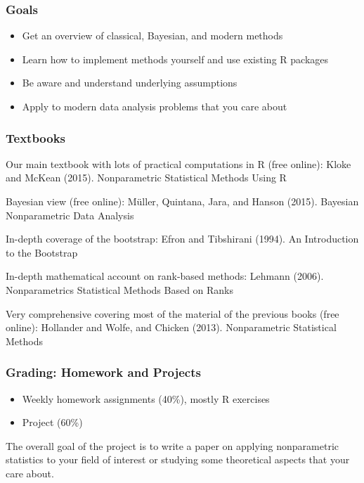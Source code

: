 \documentclass[10pt]{beamer}
\begin{document}
\begin{frame}
\frametitle{Goals}

\begin{itemize}
\item Get an overview of classical, Bayesian, and modern methods
\item Learn how to implement methods yourself and use existing R packages
\item Be aware and understand underlying assumptions
\item Apply to modern data analysis problems that you care about
\end{itemize}

\end{frame}

\begin{frame}
\frametitle{Textbooks}

Our main textbook with lots of practical computations in R (free online): \newline
Kloke and McKean (2015). Nonparametric Statistical Methods Using R \newline

Bayesian view (free online): \newline
M\"uller, Quintana, Jara, and Hanson (2015). Bayesian Nonparametric Data Analysis \newline

In-depth coverage of the bootstrap: \newline
Efron and Tibshirani (1994). An Introduction to the Bootstrap  \newline

In-depth mathematical account on rank-based methods: \newline
Lehmann (2006). Nonparametrics Statistical Methods Based on Ranks \newline

Very comprehensive covering most of the material of the previous books (free online): \newline
Hollander and Wolfe, and Chicken (2013). Nonparametric Statistical Methods \newline

\end{frame}

\begin{frame}
\frametitle{Grading: Homework and Projects}

\begin{itemize}
\item Weekly homework assignments (40\%), mostly R exercises
\item Project (60\%)
\end{itemize}

The overall goal of the project is to write a paper on applying nonparametric statistics to your field of interest or studying some theoretical aspects that your care about.

\end{frame}
\end{document}
